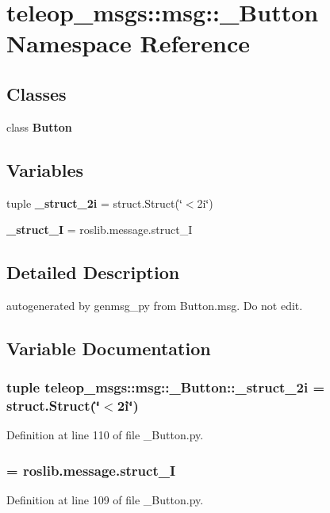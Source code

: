 \section{teleop\_\-msgs::msg::\_\-Button Namespace Reference}
\label{namespaceteleop__msgs_1_1msg_1_1__Button}
\subsection*{Classes}
\begin{DoxyCompactItemize}
\item 
class {\bf Button}
\end{DoxyCompactItemize}
\subsection*{Variables}
\begin{DoxyCompactItemize}
\item 
tuple {\bf \_\-struct\_\-2i} = struct.Struct(\char`\"{}$<$2i\char`\"{})
\item 
{\bf \_\-struct\_\-I} = roslib.message.struct\_\-I
\end{DoxyCompactItemize}


\subsection{Detailed Description}
\begin{DoxyVerb}autogenerated by genmsg_py from Button.msg. Do not edit.\end{DoxyVerb}
 

\subsection{Variable Documentation}
\subsubsection[{\_\-struct\_\-2i}]{\setlength{\rightskip}{0pt plus 5cm}tuple {\bf teleop\_\-msgs::msg::\_\-Button::\_\-struct\_\-2i} = struct.Struct(\char`\"{}$<$2i\char`\"{})}\label{namespaceteleop__msgs_1_1msg_1_1__Button_a3598ab517e7a0de3fb9b4581b00311b6}


Definition at line 110 of file \_\-Button.py.

\subsubsection[{\_\-struct\_\-I}]{ = roslib.message.struct\_\-I}\label{namespaceteleop__msgs_1_1msg_1_1__Button_a2805b5f152865b620e0a5abcf67526a8}


Definition at line 109 of file \_\-Button.py.

